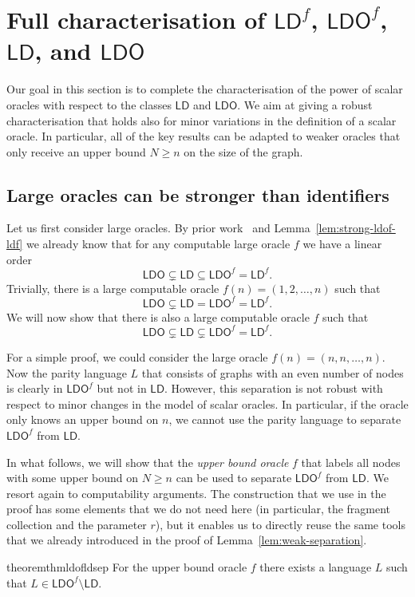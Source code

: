 \documentclass[11pt,a4paper]{article}
\theoremstyle{definition}
\theoremstyle{remark}
\newcommand{\ldo}{\mathsf{LDO}}
\newcommand{\ld}{\mathsf{LD}}
\begin{document}
\section{Full characterisation of \texorpdfstring{$\ld^f$, $\ldo^f$, $\ld$, and $\ldo$}{LDf, LDOf, LD, and LDO}}

Our goal in this section is to complete the characterisation of the power of scalar oracles with respect to the classes $\ld$ and $\ldo$. We aim at giving a robust characterisation that holds also for minor variations in the definition of a scalar oracle. In particular, all of the key results can be adapted to weaker oracles that only receive an upper bound $N \ge n$ on the size of the graph.

\subsection{Large oracles can be stronger than identifiers}

Let us first consider large oracles. By prior work~\cite{fraigniaud13ld-id} and Lemma~\ref{lem:strong-ldof-ldf} we already know that for any computable large oracle $f$ we have a linear order
\[
    \ldo \subsetneq \ld \subseteq \ldo^f=\ld^f.
\]
Trivially, there is a large computable oracle $f(n) = (1,2,\dotsc,n)$ such that
\[
    \ldo \subsetneq \ld = \ldo^f=\ld^f.
\]
We will now show that there is also a large computable oracle $f$ such that
\[
    \ldo \subsetneq \ld \subsetneq \ldo^f=\ld^f.
\]

For a simple proof, we could consider the large oracle $f(n) = (n,n,\dotsc,n)$. Now the parity language $L$ that consists of graphs with an even number of nodes is clearly in $\ldo^f$ but not in $\ld$. However, this separation is not robust with respect to minor changes in the model of scalar oracles. In particular, if the oracle only knows an upper bound on $n$, we cannot use the parity language to separate $\ldo^f$ from $\ld$.

In what follows, we will show that the \emph{upper bound oracle} $f$ that labels all nodes with some upper bound on $N \ge n$ can be used to separate $\ldo^f$ from $\ld$. We resort again to computability arguments. The construction that we use in the proof has some elements that we do not need here (in particular, the fragment collection and the parameter $r$), but it enables us to directly reuse the same tools that we already introduced in the proof of Lemma~\ref{lem:weak-separation}.

\begin{restatable}{theorem}{thmldofldsep} \label{thm:ldof-ld-sep}
    For the upper bound oracle $f$ there exists a language $L$ such that $L \in \ldo^f \setminus \ld$.
\end{restatable}
\end{document}
